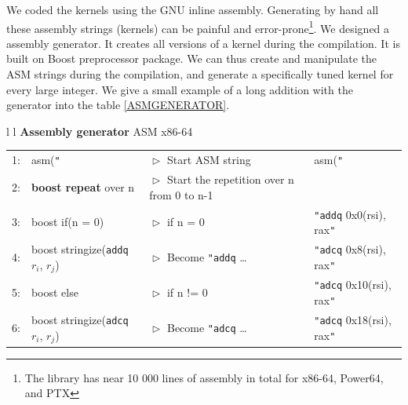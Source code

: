 \documentclass[oribibl]{llncs2e/llncs}
\begin{document}
We coded the kernels using the GNU inline assembly.
Generating by hand all these  assembly strings (kernels)  can be painful and error-prone\footnote{The library has near 10 000 lines of assembly in total for x86-64, Power64, and PTX}.
We designed a assembly generator. It creates all versions of a kernel during the compilation.   
It is built on Boost preprocessor package. We can thus create and manipulate the ASM strings during the compilation, 
and generate a specifically tuned kernel for every large integer. We give a small example of a long addition with the generator into the table \ref{ASMGENERATOR}.

 \begin{table}[h] 
	\begin{center}
	 	\begin{tabular}{l l}
                           \hline 
                           \textbf{Assembly generator}      \hspace{8.5 cm}  ASM  x86-64 \\ \hline
                           \begin{tabular}{l l l l } 
                               \tiny{1:} &  asm(\texttt{"}     &  $\vartriangleright$ Start ASM string & asm(\texttt{"} \\
                               \tiny{2:} &  \textbf{boost  repeat} over n  &$\vartriangleright$  Start the repetition over n from 0 to n-1 &   \\
                               \tiny{3:} &   \hspace{0.2 cm}  boost  if(n = 0) &  $\vartriangleright$   if n = 0 &  \hspace{0.2 cm}  \texttt{"}\texttt{addq} 0x0(rsi), rax\texttt{"}\\    
                               \tiny{4:} &   \hspace{0.4 cm}  boost stringize(\texttt{addq}  $r_i$, $r_j$)  &$\vartriangleright$   Become \texttt{"addq} \dots &  \hspace{0.2 cm}    \texttt{"}\texttt{adcq}  0x8(rsi), rax\texttt{"}\\    
                               \tiny{5:} &   \hspace{0.2 cm}  boost  else  & $\vartriangleright$   if n != 0 &  \hspace{0.2 cm}  \texttt{"}\texttt{adcq}  0x10(rsi), rax\texttt{"} \\ 
                               \tiny{6:} &   \hspace{0.4 cm}  boost stringize(\texttt{adcq}  $r_i$, $r_j$)  &$\vartriangleright$   Become \texttt{"adcq} \dots &  \hspace{0.2 cm}   \texttt{"}\texttt{adcq}  0x18(rsi), rax\texttt{"}\\     

\end{tabular}
\end{tabular}
\end{center}
\end{table}
\end{document}
